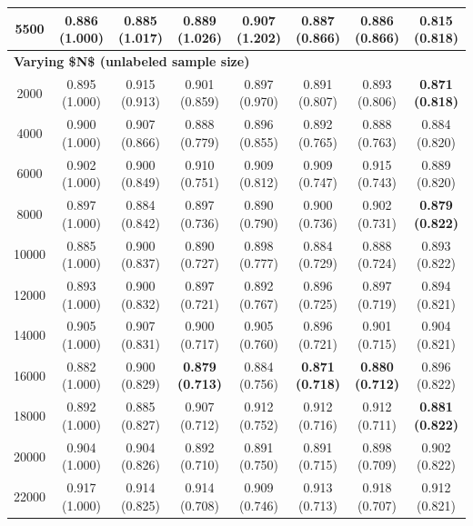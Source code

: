 \begin{table}[!h]
{\begin{tabular}[t]{|c|ccccccc|}
\hspace{1em}5500 & 0.886 (1.000) & 0.885 (1.017) & 0.889 (1.026) & 0.907 (1.202) & 0.887 (0.866) & 0.886 (0.866) & \textbf{0.815 (0.818)}\\
\hline
\multicolumn{8}{|l|}{\textbf{Varying \$N\$ (unlabeled sample size)}}\\
\hspace{1em}2000 & 0.895 (1.000) & 0.915 (0.913) & 0.901 (0.859) & 0.897 (0.970) & 0.891 (0.807) & 0.893 (0.806) & \textbf{0.871 (0.818)}\\
\hspace{1em}4000 & 0.900 (1.000) & 0.907 (0.866) & 0.888 (0.779) & 0.896 (0.855) & 0.892 (0.765) & 0.888 (0.763) & 0.884 (0.820)\\
\hspace{1em}6000 & 0.902 (1.000) & 0.900 (0.849) & 0.910 (0.751) & 0.909 (0.812) & 0.909 (0.747) & 0.915 (0.743) & 0.889 (0.820)\\
\hspace{1em}8000 & 0.897 (1.000) & 0.884 (0.842) & 0.897 (0.736) & 0.890 (0.790) & 0.900 (0.736) & 0.902 (0.731) & \textbf{0.879 (0.822)}\\
\hspace{1em}10000 & 0.885 (1.000) & 0.900 (0.837) & 0.890 (0.727) & 0.898 (0.777) & 0.884 (0.729) & 0.888 (0.724) & 0.893 (0.822)\\
\hspace{1em}12000 & 0.893 (1.000) & 0.900 (0.832) & 0.897 (0.721) & 0.892 (0.767) & 0.896 (0.725) & 0.897 (0.719) & 0.894 (0.821)\\
\hspace{1em}14000 & 0.905 (1.000) & 0.907 (0.831) & 0.900 (0.717) & 0.905 (0.760) & 0.896 (0.721) & 0.901 (0.715) & 0.904 (0.821)\\
\hspace{1em}16000 & 0.882 (1.000) & 0.900 (0.829) & \textbf{0.879 (0.713)} & 0.884 (0.756) & \textbf{0.871 (0.718)} & \textbf{0.880 (0.712)} & 0.896 (0.822)\\
\hspace{1em}18000 & 0.892 (1.000) & 0.885 (0.827) & 0.907 (0.712) & 0.912 (0.752) & 0.912 (0.716) & 0.912 (0.711) & \textbf{0.881 (0.822)}\\
\hspace{1em}20000 & 0.904 (1.000) & 0.904 (0.826) & 0.892 (0.710) & 0.891 (0.750) & 0.891 (0.715) & 0.898 (0.709) & 0.902 (0.822)\\
\hspace{1em}22000 & 0.917 (1.000) & 0.914 (0.825) & 0.914 (0.708) & 0.909 (0.746) & 0.913 (0.713) & 0.918 (0.707) & 0.912 (0.821)\\
\hline
\end{tabular}}
\end{table}
